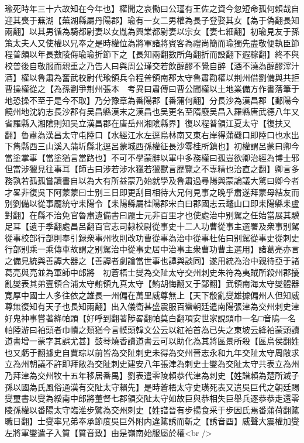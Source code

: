 瑜死時年三十六故知在今年也】權聞之哀慟曰公瑾有王佐之資今忽短命孤何賴哉自迎其喪于蕪湖【蕪湖縣屬丹陽郡】瑜有一女二男權為長子登娶其女【為于偽翻長知兩翻】以其男循為騎都尉妻以女胤為興業都尉妻以宗女【妻七細翻】初瑜見友于孫策太夫人又使權以兄奉之是時權位為將軍諸將賓客為禮尚簡而瑜獨先盡敬便執臣節程普頗以年長數陵侮瑜瑜折節下之【長知兩翻數所角翻折而設翻下遐稼翻】終不與校普後自敬服而親重之乃告人曰與周公瑾交若飲醇醪不覺自醉【酒不澆為醇醪滓汁酒】權以魯肅為奮武校尉代瑜領兵令程普領南郡太守魯肅勸權以荆州借劉備與共拒曹操權從之【為孫劉爭荆州張本　考異曰肅傳曰曹公聞權以土地業備方作書落筆于地恐操不至于是今不取】乃分豫章為番陽郡【番蒲何翻】分長沙為漢昌郡【鄱陽今饒州地沈約志長沙郡有吴昌縣漢末之漢昌也吴更名至隋廢吴昌入羅縣唐武德八年又省羅縣入湘隂則知吴立漢昌郡在唐岳州湘隂縣界】復以程普領江夏太守【復扶又翻】魯肅為漢昌太守屯陸口【水經江水左逕烏林南又東右岸得蒲磯口即陸口也水出下雋縣西三山溪入蒲圻縣北逕呂蒙城西孫權征長沙零桂所鎮也】初權謂呂蒙曰卿今當塗掌事【當塗猶言當路也】不可不學蒙辭以軍中多務權曰孤豈欲卿治經為博士邪但當涉獵見往事耳【師古曰涉若涉水獵若獵獸言歷覽之不專精也治直之翻】卿言多務孰若孤孤嘗讀書自以為大有所益蒙乃始就學及魯肅過尋陽與蒙論議大驚曰卿今者才畧非復吳下阿蒙蒙曰士别三日即更刮目相待大兄何見事之晚乎肅遂拜蒙母結友而别劉備以從事龎統守耒陽令【耒陽縣屬桂陽郡宋白曰郡國志云鼇山口即耒陽縣耒盧對翻】在縣不治免官魯肅遺備書曰龎士元非百里才也使處治中别駕之任始當展其驥足耳【遺于季翻處昌呂翻百官志司隸校尉從事史十二人功曹從事主選署及衆事别駕從事校部行部則奉引録衆事州牧則改功曹從事為治中從事杜佑曰别駕從事史從刺史行部别乘一乘傳車故謂之别駕治中從事史居中治事主衆曹功曹主選用】諸葛亮亦言之備見統與善譚大器之【善譚者劇論當世事也譚與談同】遂用統為治中親待亞于諸葛亮與亮並為軍師中郎將　初蒼梧士燮為交阯太守交州刺史朱符為夷賊所殺州郡擾亂燮表其弟壹領合浦太守䵋領九真太守【䵋胡悔翻又于鄙翻】武領南海太守燮體器寛厚中國士人多往依之雄長一州偏在萬里威尊無上【天下殽亂燮雄據偏州人但知威尊無復知有天子也長知兩翻】出入儀衛甚盛震服百蠻朝廷遣南陽張津為交州刺史津好鬼神事嘗著絳帕頭【好呼到翻著陟畧翻帕莫白翻項安世家說頭巾一名□音隖一名帕陸游曰袙頭者巾幘之類猶今言幞頭韓文公云以紅袙首為已失之東坡云絳袙蒙頭讀道書增一蒙字其誤尤甚】鼓琴燒香讀道書云可以助化為其將區景所殺【區烏侯翻姓也又虧于翻據史自賈琮以前皆為交阯刺史未得為交州晉志永和九年交阯太守周敞求立為州朝議不許即拜敞為交阯刺史建安八年張津為刺史士燮為交阯太守共表立為州乃拜津為交州牧十五年移居番禺】劉表遣零陵賴恭代津為刺史【姓譜賴為楚所滅子孫以國為氏風俗通漢有交阯太守賴先】是時蒼梧太守史璜死表又遣吳巨代之朝廷賜燮璽書以燮為綏南中郎將董督七郡領交阯太守如故巨與恭相失巨舉兵逐恭恭走還零陵孫權以番陽太守臨淮步騭為交州刺史【姓譜晉有步揚食采于步因氏焉番蒲荷翻騭職日翻】士燮率兄弟奉承節度吳巨外附内違騭誘而斬之【誘音酉】威聲大震權加燮左將軍燮遣子入質【質音致】由是嶺南始服屬於權<br />
